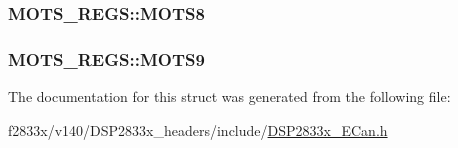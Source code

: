 \subsubsection[{M\+O\+T\+S8}]{ M\+O\+T\+S\+\_\+\+R\+E\+G\+S\+::\+M\+O\+T\+S8}\label{struct_m_o_t_s___r_e_g_s_a2fc9e5c92c4977f0798c89a8f7fadf92}
\hypertarget{struct_m_o_t_s___r_e_g_s_a5dceebf8e86b20779573352354a36711}{}
\subsubsection[{M\+O\+T\+S9}]{ M\+O\+T\+S\+\_\+\+R\+E\+G\+S\+::\+M\+O\+T\+S9}\label{struct_m_o_t_s___r_e_g_s_a5dceebf8e86b20779573352354a36711}


The documentation for this struct was generated from the following file\+:\begin{DoxyCompactItemize}
\item 
f2833x/v140/\+D\+S\+P2833x\+\_\+headers/include/\hyperlink{_d_s_p2833x___e_can_8h}{D\+S\+P2833x\+\_\+\+E\+Can.\+h}\end{DoxyCompactItemize}
